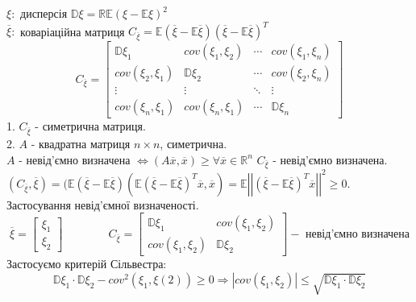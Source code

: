 \documentclass[14pt,a4paper]{scrartcl}
\theoremstyle{definition}
\theoremstyle{remark}
\theoremstyle{definition}
\theoremstyle{definition}
\begin{document}
$\xi: $ дисперсія $\mathbb{D} \xi = \mathbb{R}\mathbb{E} (\xi - \mathbb{E}\xi)^2$\\
$ \overline{\xi}: $ коваріаційна матриця $C_{ \overline{\xi}} = \mathbb{E}( \overline{\xi} - \mathbb{E}\overline{\xi})(\overline{\xi} - \mathbb{E} \overline{\xi})^T$
$$
C_{ \overline{\xi}} = \begin{bmatrix}
 \mathbb{D} \xi_1 & cov(\xi_1, \xi_2) & \cdots & cov(\xi_1, \xi_n) \\
 cov(\xi_2, \xi_1) & \mathbb{D}\xi_2 & \cdots & cov(\xi_2, \xi_n)\\
 \vdots & \vdots & \ddots & \vdots\\
 cov(\xi_n, \xi_1)& cov(\xi_n, \xi_1) & \cdots & \mathbb{D}\xi_n
\end{bmatrix}
$$
1. $C_{\overline{\xi}}$ - симетрична матриця.\\
2. $A$ - квадратна матриця $n \times n$, симетрична.\\$A$ - невід'ємно визначена $\Leftrightarrow (A \overline{x}, \overline{x}) \geq \forall  \overline{x} \in \mathbb{R}^n$
$C_{\overline{\xi}}$ - невід'ємно визначена. $ (C_{\overline{\xi}}, \overline{\xi}) = (\mathbb{E}(\overline{\xi} - \mathbb{E}\overline{\xi})(\mathbb{E}(\overline{\xi} - \mathbb{E}\overline{\xi})^T \overline{x}, \overline{x} ) = \mathbb{E} \left| \left| (\overline{\xi} - \mathbb{E} \overline{\xi})^T \overline{x}\right| \right|^2 \geq 0 $.\\
Застосування невід'ємної визначеності.
$$
\overline{\xi} = \begin{bmatrix}
 \xi_1\\
 \xi_2
\end{bmatrix} \qquad \qquad C_{ \overline{\xi}} = \begin{bmatrix}
 \mathbb{D}\xi_1 & cov(\xi_1, \xi_2) \\
 cov(\xi_1, \xi_2) & \mathbb{D} \xi_2
\end{bmatrix} - \text{ невід'ємно визначена}
$$
Застосуємо критерій Сільвестра:
$$
\mathbb{D}\xi_1 \cdot \mathbb{D}\xi_2 - cov^2(\xi_1, \xi(2)) \geq 0 \Longrightarrow  \left| cov(\xi_1, \xi_2) \right| \leq \sqrt{ \mathbb{D} \xi_1 \cdot \mathbb{D}\xi_2}
$$
\end{document}
